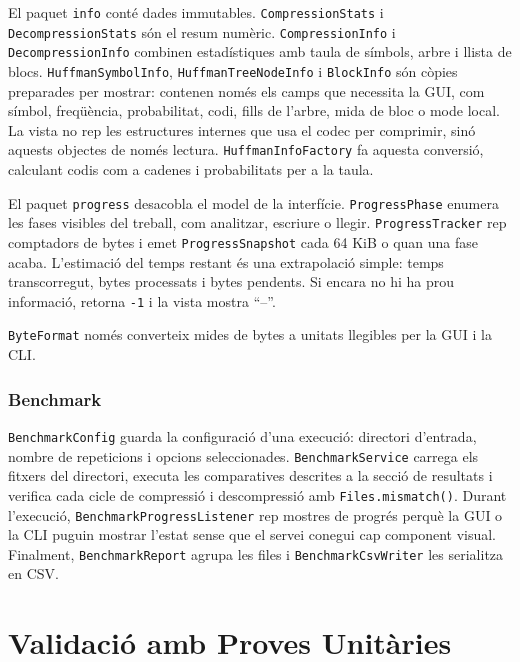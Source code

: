 \documentclass[conference,compsoc]{IEEEtran}
\begin{document}
El paquet \texttt{info} conté dades immutables. \texttt{CompressionStats}
i \texttt{DecompressionStats} són el resum numèric. \texttt{CompressionInfo}
i \texttt{DecompressionInfo} combinen estadístiques amb taula de símbols,
arbre i llista de blocs. \texttt{HuffmanSymbolInfo},
\texttt{HuffmanTreeNodeInfo} i \texttt{BlockInfo} són còpies preparades
per mostrar: contenen només els camps que necessita la GUI, com símbol,
freqüència, probabilitat, codi, fills de l'arbre, mida de bloc o mode
local. La vista no rep les estructures internes que usa el codec per
comprimir, sinó aquests objectes de només lectura. \texttt{HuffmanInfoFactory}
fa aquesta conversió, calculant codis com a cadenes i probabilitats per a
la taula.

El paquet \texttt{progress} desacobla el model de la interfície.
\texttt{ProgressPhase} enumera les fases visibles del treball, com
analitzar, escriure o llegir. \texttt{ProgressTracker} rep comptadors de
bytes i emet \texttt{ProgressSnapshot} cada 64 KiB o quan una fase acaba.
L'estimació del temps restant és una extrapolació simple: temps
transcorregut, bytes processats i bytes pendents. Si encara no hi ha prou
informació, retorna \texttt{-1} i la vista mostra ``--''.

\texttt{ByteFormat} només converteix mides de bytes a unitats llegibles
per la GUI i la CLI.

\subsubsection{Benchmark}

\texttt{BenchmarkConfig} guarda la configuració d'una execució: directori
d'entrada, nombre de repeticions i opcions seleccionades.
\texttt{BenchmarkService} carrega els fitxers del directori, executa les
comparatives descrites a la secció de resultats i verifica cada cicle de
compressió i descompressió
amb \texttt{Files.mismatch()}. Durant l'execució,
\texttt{BenchmarkProgressListener} rep mostres de progrés perquè la GUI o
la CLI puguin mostrar l'estat sense que el servei conegui cap component
visual. Finalment, \texttt{BenchmarkReport} agrupa les files i
\texttt{BenchmarkCsvWriter} les serialitza en CSV.


\section{Validació amb Proves Unitàries}
\end{document}
